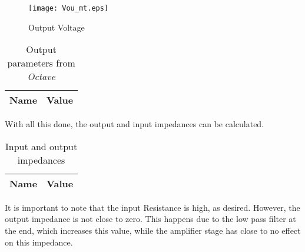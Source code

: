 \begin{figure}[H]
    \centering
    \texttt{[image: Vou\_mt.eps]}
    \caption{Output Voltage}
    \label{fig:VoltOut}
\end{figure}


\begin{table}[H]
  \centering
  \begin{tabular}{|l|r|}
    \hline    
    {\bf Name} & {\bf Value} \\ \hline
    
  \end{tabular}
  \caption{Output parameters from {\it Octave} }
  \label{tab:OutputParam}
\end{table}

With all this done, the output and input impedances can be calculated.

\begin{table}[H]
  \centering
  \begin{tabular}{|l|r|}
    \hline    
    {\bf Name} & {\bf Value} \\ \hline
    
  \end{tabular}
  \caption{Input and output impedances}
  \label{tab:ImpOC}
\end{table}

It is important to note that the input Resistance is high, as desired. However, the output impedance is not close to zero. This happens due to the low pass filter at the end, which increases this value, while the amplifier stage has close to no effect on this impedance.
